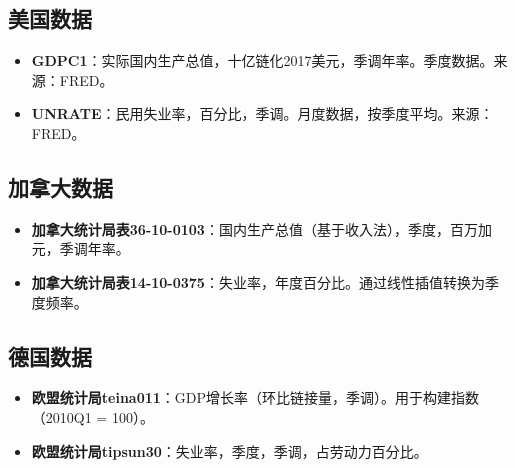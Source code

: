 \documentclass[12pt,a4paper,UTF8]{ctexart}
\begin{document}
\subsection{美国数据}

\begin{itemize}
    \item \textbf{GDPC1}：实际国内生产总值，十亿链化2017美元，季调年率。季度数据。来源：FRED。
    \item \textbf{UNRATE}：民用失业率，百分比，季调。月度数据，按季度平均。来源：FRED。
\end{itemize}

\subsection{加拿大数据}

\begin{itemize}
    \item \textbf{加拿大统计局表36-10-0103}：国内生产总值（基于收入法），季度，百万加元，季调年率。
    \item \textbf{加拿大统计局表14-10-0375}：失业率，年度百分比。通过线性插值转换为季度频率。
\end{itemize}

\subsection{德国数据}

\begin{itemize}
    \item \textbf{欧盟统计局teina011}：GDP增长率（环比链接量，季调）。用于构建指数（2010Q1 = 100）。
    \item \textbf{欧盟统计局tipsun30}：失业率，季度，季调，占劳动力百分比。
\end{itemize}
\end{document}
